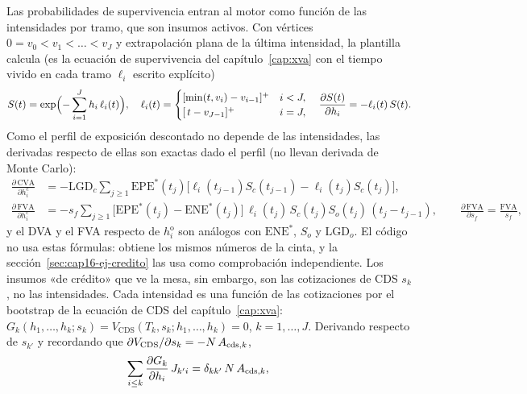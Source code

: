 \begin{sloppypar}
Las probabilidades de supervivencia entran al motor como función de las intensidades por tramo, que son insumos
activos. Con vértices $0=v_0<v_1<\dots<v_J$ y extrapolación plana de la última intensidad, la plantilla
 calcula (es la
ecuación de supervivencia del capítulo~\ref{cap:xva} con el tiempo vivido en cada tramo $\ell_i$ escrito explícito)
\begin{equation}\label{eq:cap16-supervivencia-activa}
  S(t)=\exp\Bigl(-\sum_{i=1}^{J}h_i\,\ell_i(t)\Bigr),\quad
  \ell_i(t)=\begin{cases}[\min(t,v_i)-v_{i-1}]^+ & i<J,\\ [\,t-v_{J-1}]^+ & i=J,\end{cases}\quad
  \frac{\partial S(t)}{\partial h_i}=-\ell_i(t)\,S(t).
\end{equation}
Como el perfil de exposición descontado no depende de las intensidades, las derivadas respecto de ellas son exactas
dado el perfil (no llevan derivada de Monte Carlo):
\begin{equation}\label{eq:cap16-dcva-dh}
\begin{aligned}
  \frac{\partial\,\mathrm{CVA}}{\partial h^{\mathrm c}_i}&=-\mathrm{LGD}_c\sum_{j\ge1}\mathrm{EPE}^*(t_j)\bigl[\ell_i(t_{j-1})S_c(t_{j-1})-\ell_i(t_j)S_c(t_j)\bigr],\\
  \frac{\partial\,\mathrm{FVA}}{\partial h^{\mathrm c}_i}&=-s_f\sum_{j\ge1}\bigl[\mathrm{EPE}^*(t_j)-\mathrm{ENE}^*(t_j)\bigr]\,\ell_i(t_j)\,S_c(t_j)S_o(t_j)\,(t_j-t_{j-1}),\qquad
  \frac{\partial\,\mathrm{FVA}}{\partial s_f}=\frac{\mathrm{FVA}}{s_f},
\end{aligned}
\end{equation}
y el DVA y el FVA respecto de $h^{\mathrm o}_i$ son análogos con $\mathrm{ENE}^*$, $S_o$ y $\mathrm{LGD}_o$. El código
no usa estas fórmulas: obtiene los mismos números de la cinta, y la sección~\ref{sec:cap16-ej-credito} las usa
como comprobación independiente. Los insumos «de crédito» que ve la mesa, sin embargo, son las cotizaciones de CDS
$s_k$, no las intensidades. Cada intensidad es una función de las cotizaciones por el bootstrap de la
ecuación de CDS del capítulo~\ref{cap:xva}: $G_k(h_1,\dots,h_k;s_k)=V_{\mathrm{CDS}}(T_k,s_k;h_1,\dots,h_k)=0$,
$k=1,\dots,J$. Derivando respecto de $s_{k'}$ y recordando que $\partial V_{\mathrm{CDS}}/\partial s_k=-N\,A_{\mathrm{cds},k}$,
\begin{equation}\label{eq:cap16-jacobiano}
  \sum_{i\le k}\frac{\partial G_k}{\partial h_i}\,J_{k'i}=\delta_{kk'}\,\Nom\,\Ann_{\mathrm{cds},k},\qquad

\end{equation}
\end{sloppypar}
